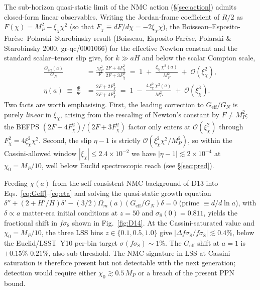 \documentclass[epjc3,twocolumn]{svjour3}
\begin{document}
The sub-horizon quasi-static limit of the NMC action (\S\ref{sec:action})
admits closed-form linear observables. Writing the Jordan-frame coefficient
of $R/2$ as $F(\chi)=M_P^2-\xi_\chi\chi^2$ (so that $F_\chi\equiv dF/d\chi =
-2\xi_\chi\chi$), the Boisseau--Esposito-Far\`ese--Polarski--Starobinsky
result (Boisseau, Esposito-Far\`ese, Polarski \& Starobinsky 2000, gr-qc/0001066) for the effective Newton constant and the standard
scalar--tensor slip give, for $k\gg aH$ and below the scalar Compton scale,
%
\begin{align}
\frac{G_{\mathrm{eff}}(a)}{G_N}
  &= \frac{M_P^2}{F}\,\frac{2F+4F_\chi^2}{2F+3F_\chi^2}
   \;=\; 1 \;+\; \frac{\xi_\chi\,\chi^2(a)}{M_P^2} \;+\; \mathcal O\!\left(\xi_\chi^2\right),
   \label{eq:Geff}\\[2pt]
\eta(a)\;\equiv\;\frac{\Phi}{\Psi}
  &= \frac{2F+2F_\chi^2}{2F+4F_\chi^2}
   \;=\; 1 \;-\; \frac{4\,\xi_\chi^2\,\chi^2(a)}{M_P^2} \;+\; \mathcal O\!\left(\xi_\chi^3\right).
   \label{eq:eta}
\end{align}
%
Two facts are worth emphasising. First, the leading correction to
$G_{\mathrm{eff}}/G_N$ is purely \emph{linear} in $\xi_\chi$, arising from
the rescaling of Newton's constant by $F\ne M_P^2$; the BEFPS
$(2F\!+\!4F_\chi^2)/(2F\!+\!3F_\chi^2)$ factor only enters at
$\mathcal O(\xi_\chi^2)$ through $F_\chi^2=4\xi_\chi^2\chi^2$. Second, the
slip $\eta-1$ is strictly $\mathcal O(\xi_\chi^2\chi^2/M_P^2)$, so within
the Cassini-allowed window $|\xi_\chi|\leq 2.4\times10^{-2}$ we have
$|\eta-1|\lesssim 2\times10^{-4}$ at $\chi_0=M_P/10$, well below Euclid
spectroscopic reach (see \S\ref{sec:pred}).

Feeding $\chi(a)$ from the self-consistent NMC background of D13 into
Eqs.~\eqref{eq:Geff}--\eqref{eq:eta} and solving the quasi-static growth
equation $\delta''+(2+H'/H)\delta'-(3/2)\Omega_m(a)(G_{\mathrm{eff}}/G_N)\delta=0$
(prime $\equiv d/d\ln a$), with $\delta\propto a$ matter-era initial
conditions at $z=50$ and $\sigma_8(0)=0.811$, yields the fractional shift
in $f\sigma_8$ shown in Fig.~\ref{fig:D14}. At the Cassini-saturated value
and $\chi_0=M_P/10$, the three LSS bins $z\in\{0.1,0.5,1.0\}$ give
$|\Delta f\sigma_8/f\sigma_8|\lesssim 0.4\%$, below the Euclid/LSST~Y10
per-bin target $\sigma(f\sigma_8)\sim 1\%$. The $G_{\mathrm{eff}}$ shift at
$a=1$ is $\pm 0.15\%$-$0.21\%$, also sub-threshold. The NMC signature in
LSS at Cassini saturation is therefore present but not detectable with the
next generation; detection would require either $\chi_0\gtrsim 0.5\,M_P$ or
a breach of the present PPN bound.
\end{document}
